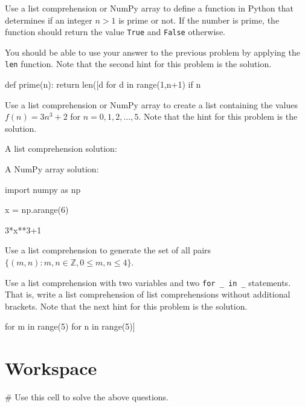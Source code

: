 \documentclass{ximera}
\begin{document}
\begin{question}
Use a list comprehension or NumPy array to define a function in Python that determines if an integer $n>1$ is prime or not. If the number is prime, the function should return the value \verb|True| and \verb|False| otherwise.
	\begin{hint}
	You should be able to use your answer to the previous problem by applying the \verb|len| function. Note that the second hint for this problem is the solution.
	\end{hint}
	\begin{hint}
\begin{sageCell}
def prime(n):
        return len([d for d in range(1,n+1) if n%
\end{sageCell}
	\end{hint}
\end{question}

\begin{question}
	Use a list comprehension or NumPy array to create a list containing the values $f(n)=3n^3+2$ for $n=0,1,2,\dots,5$. Note that the hint for this problem is the solution.
	\begin{hint}
A list comprehension solution:
\begin{sageCell}
\end{sageCell}
A NumPy array solution:
\begin{sageCell}
import numpy as np

x = np.arange(6)

3*x**3+1
\end{sageCell}
	\end{hint}
\end{question}

\begin{question}
	Use a list comprehension to generate the set of all pairs $\{(m,n):m,n\in\mathbb{Z}, 0\leq m,n\leq 4\}$. 
	\begin{hint}
	Use a list comprehension with two variables and two \verb|for _ in _| statements. That is, write a list comprehension of list comprehensions without additional brackets. Note that the next hint for this problem is the solution. 
	\end{hint}
	\begin{hint}
\begin{sageCell}
	[[m,n] for m in range(5) for n in range(5)]
\end{sageCell}
	\end{hint}
\end{question}

\section{Workspace}

\begin{sageCell}
# Use this cell to solve the above questions.
\end{sageCell}
\end{document}
